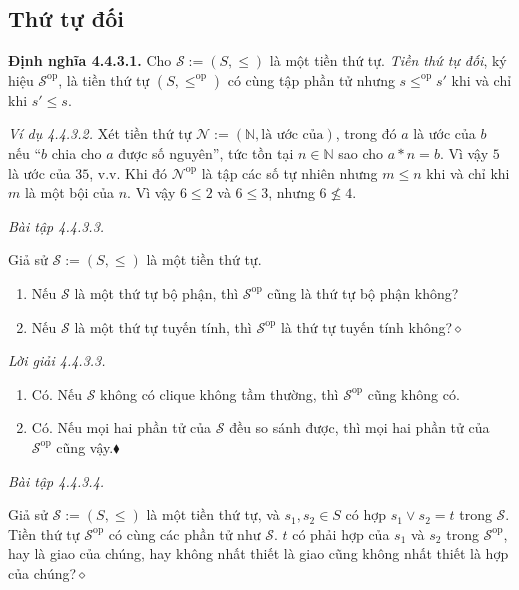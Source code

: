 \subsection{Thứ tự đối}

\noindent\textbf{Định nghĩa 4.4.3.1.} Cho $\mathcal{S}:=(S,\le)$ là một tiền thứ tự. \emph{Tiền thứ tự đối}, ký hiệu $\mathcal{S}^{\mathrm{op}}$, là tiền thứ tự $(S,\le^{\mathrm{op}})$ có cùng tập phần tử nhưng $s\le^{\mathrm{op}}s'$ khi và chỉ khi $s'\le s$.

\noindent\textit{Ví dụ 4.4.3.2.} Xét tiền thứ tự $\mathcal{N}:=(\mathbb{N},\text{là ước của})$, trong đó $a$ là ước của $b$ nếu ``$b$ chia cho $a$ được số nguyên'', tức tồn tại $n\in\mathbb{N}$ sao cho $a*n=b$. Vì vậy $5$ là ước của $35$, v.v. Khi đó $\mathcal{N}^{\mathrm{op}}$ là tập các số tự nhiên nhưng $m\le n$ khi và chỉ khi $m$ là một bội của $n$. Vì vậy $6\le2$ và $6\le3$, nhưng $6\nleq4$.

\noindent\textit{Bài tập 4.4.3.3.}\keepwithnext

Giả sử $\mathcal{S}:=(S,\le)$ là một tiền thứ tự.
\begin{enumerate}[label=\alph*.]
\item Nếu $\mathcal{S}$ là một thứ tự bộ phận, thì $\mathcal{S}^{\mathrm{op}}$ cũng là thứ tự bộ phận không?
\item Nếu $\mathcal{S}$ là một thứ tự tuyến tính, thì $\mathcal{S}^{\mathrm{op}}$ là thứ tự tuyến tính không?\nobreak\hfill$\diamond$
\end{enumerate}

\noindent\textit{Lời giải 4.4.3.3.}\keepwithnext
\begin{enumerate}[label=\alph*.]
\item Có. Nếu $\mathcal{S}$ không có clique không tầm thường, thì $\mathcal{S}^{\mathrm{op}}$ cũng không có.
\item Có. Nếu mọi hai phần tử của $\mathcal{S}$ đều so sánh được, thì mọi hai phần tử của $\mathcal{S}^{\mathrm{op}}$ cũng vậy.\nobreak\hfill$\blacklozenge$
\end{enumerate}

\noindent\textit{Bài tập 4.4.3.4.}\keepwithnext

Giả sử $\mathcal{S}:=(S,\le)$ là một tiền thứ tự, và $s_1,s_2\in S$ có hợp $s_1\vee s_2=t$ trong $\mathcal{S}$. Tiền thứ tự $\mathcal{S}^{\mathrm{op}}$ có cùng các phần tử như $\mathcal{S}$. $t$ có phải hợp của $s_1$ và $s_2$ trong $\mathcal{S}^{\mathrm{op}}$, hay là giao của chúng, hay không nhất thiết là giao cũng không nhất thiết là hợp của chúng?\hfill$\diamond$

